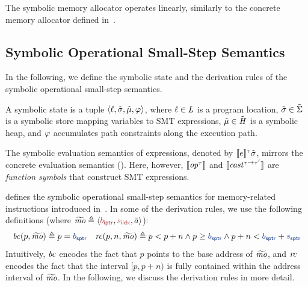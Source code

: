The symbolic memory allocator operates linearly, similarly to the concrete memory allocator defined in~.

\subsection{Symbolic Operational Small-Step Semantics}

In the following,
we define the symbolic state and the derivation rules of the symbolic operational small-step semantics.

\begin{definition}
\label{def:symbolic-state}
A symbolic state is a tuple $\langle{\ell},{\tilde\sigma},{\tilde{\mu}},{\varphi}\rangle$,
where $\ell \in \mathit{L}$ is a program location,
$\tilde\sigma \in \tilde\Sigma$ is a symbolic store mapping variables to SMT expressions,
$\tilde{\mu} \in \tilde{\mathit{H}}$ is a symbolic heap,
and $\varphi$ accumulates path constraints along the execution path.
\end{definition}

The symbolic evaluation semantics of expressions, denoted by $\llbracket e \rrbracket^{\tau}{\tilde\sigma}$, mirrors the concrete evaluation semantics ().
Here, however, $\llbracket \mathit{op}^\tau \rrbracket$ and $\llbracket \mathit{cast}^{\tau\to\tau'} \rrbracket$ are \emph{function symbols} that construct SMT expressions.

 defines the symbolic operational small-step semantics for memory-related instructions introduced in~.
In some of the derivation rules, we use the following definitions (where $\symmo \triangleq \mobj{\bvval{\addr}{\pointerwidth}}{\bvval{\size}{\indexwidth}}{\smtarray}$):
\[
\baseaddrcond(p, \symmo) \triangleq p = \bvconst{\pointerwidth}{\addr}
\quad
\rangecond(p, n, \symmo) \triangleq p < \bvadd{\pointerwidth}{p}{n} \land p \geq \bvconst{\pointerwidth}{\addr} \land \bvadd{\pointerwidth}{p}{n} < \bvadd{\pointerwidth}{\bvconst{\pointerwidth}{\addr}}{\bvconst{\pointerwidth}{\size}}
\]
Intuitively,
$\mathit{bc}$ encodes the fact that $p$ points to the base address of $\widetilde{\mathit{mo}}$,
and $\mathit{rc}$ encodes the fact that the interval $[p, p + n)$ is fully contained within the address interval of $\widetilde{\mathit{mo}}$.
In the following, we discuss the derivation rules in more detail.


